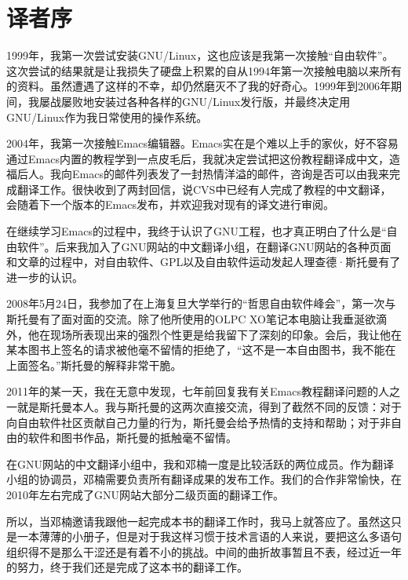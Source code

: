 \chapter{译者序}

1999年，我第一次尝试安装GNU/Linux，这也应该是我第一次接触``自由软件''。这次尝试的结果就是让我损失了硬盘上积累的自从1994年第一次接触电脑以来所有的资料。虽然遭遇了这样的不幸，却仍然磨灭不了我的好奇心。1999年到2006年期间，我屡战屡败地安装过各种各样的GNU/Linux发行版，并最终决定用GNU/Linux作为我日常使用的操作系统。

2004年，我第一次接触Emacs编辑器。Emacs实在是个难以上手的家伙，好不容易通过Emacs内置的教程学到一点皮毛后，我就决定尝试把这份教程翻译成中文，造福后人。我向Emacs的邮件列表发了一封热情洋溢的邮件，咨询是否可以由我来完成翻译工作。很快收到了两封回信，说CVS中已经有人完成了教程的中文翻译，会随着下一个版本的Emacs发布，并欢迎我对现有的译文进行审阅。

在继续学习Emacs的过程中，我终于认识了GNU工程，也才真正明白了什么是``自由软件''。后来我加入了GNU网站的中文翻译小组，在翻译GNU网站的各种页面和文章的过程中，对自由软件、GPL以及自由软件运动发起人理查德·斯托曼有了进一步的认识。

2008年5月24日，我参加了在上海复旦大学举行的``哲思自由软件峰会''，第一次与斯托曼有了面对面的交流。除了他所使用的OLPC XO笔记本电脑让我垂涎欲滴外，他在现场所表现出来的强烈个性更是给我留下了深刻的印象。会后，我让他在某本图书上签名的请求被他毫不留情的拒绝了，``这不是一本自由图书，我不能在上面签名。''斯托曼的解释非常干脆。

2011年的某一天，我在无意中发现，七年前回复我有关Emacs教程翻译问题的人之一就是斯托曼本人。我与斯托曼的这两次直接交流，得到了截然不同的反馈：对于向自由软件社区贡献自己力量的行为，斯托曼会给予热情的支持和帮助；对于非自由的软件和图书作品，斯托曼的抵触毫不留情。

在GNU网站的中文翻译小组中，我和邓楠一度是比较活跃的两位成员。作为翻译小组的协调员，邓楠需要负责所有翻译成果的发布工作。我们的合作非常愉快，在2010年左右完成了GNU网站大部分二级页面的翻译工作。

所以，当邓楠邀请我跟他一起完成本书的翻译工作时，我马上就答应了。虽然这只是一本薄薄的小册子，但是对于我这样习惯于技术言语的人来说，要把这么多语句组织得不是那么干涩还是有着不小的挑战。中间的曲折故事暂且不表，经过近一年的努力，终于我们还是完成了这本书的翻译工作。

